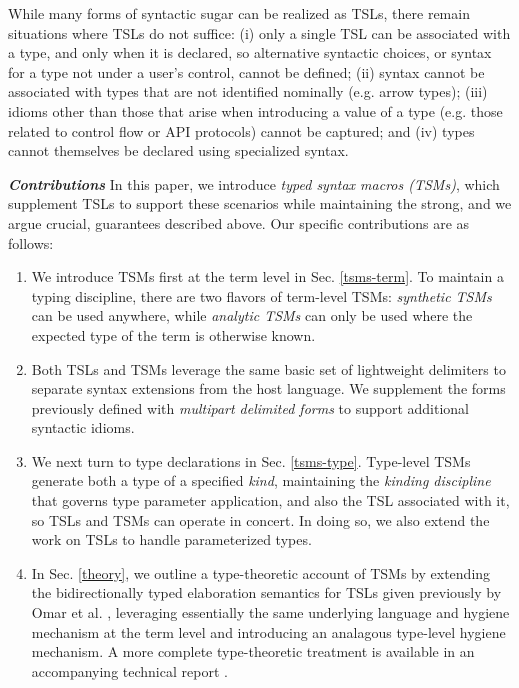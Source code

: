 \documentclass{sig-alternate}[10pt]
\begin{document}
While many forms of syntactic sugar can be realized as TSLs, there remain situations where TSLs do not suffice: (i) only a single TSL can be associated with a type, and only when it is declared, so alternative syntactic choices, or syntax for a type not under a user's control, cannot be defined; (ii) syntax cannot be associated with types that are not identified nominally (e.g. arrow types); (iii) idioms other than those that arise when introducing a value of a type (e.g. those related to control flow or API protocols) cannot be captured; and (iv) types cannot themselves be declared using specialized syntax. 

\vspace{3px}
\noindent\textbf{\textit{Contributions}} In this paper, we introduce \emph{typed syntax macros (TSMs)}, which supplement TSLs to support these scenarios while maintaining the strong, and we argue crucial, guarantees described above. Our specific contributions are as follows:%
\begin{enumerate}[noitemsep]
\item We introduce TSMs first at the term level in Sec. \ref{tsms-term}.  To maintain a typing discipline, there are two flavors of term-level TSMs: \emph{synthetic TSMs} can be used anywhere, while \emph{analytic TSMs} can only be used where the expected type of the term is otherwise known. 
\item Both TSLs and TSMs leverage the same basic set of  lightweight delimiters to separate syntax extensions from the host language. We supplement the forms previously defined with \emph{multipart delimited forms} to support additional syntactic idioms.
\item We next turn to type declarations  in Sec. \ref{tsms-type}. Type-level TSMs generate both a type of a specified \emph{kind}, maintaining the \emph{kinding discipline} that governs type parameter application, and also the TSL associated with it, so TSLs and TSMs can operate in concert. In doing so, we also extend the work on TSLs to handle parameterized types. %
\item In Sec. \ref{theory}, we outline a type-theoretic account of TSMs by extending the bidirectionally typed elaboration semantics for TSLs given previously by Omar et al. \cite{TSLs}, leveraging essentially the same underlying language and hygiene mechanism at the term level and introducing an analagous type-level hygiene mechanism. A more complete type-theoretic treatment is available in an accompanying technical report \cite{sac15tr}.%
\end{enumerate}
\end{document}
